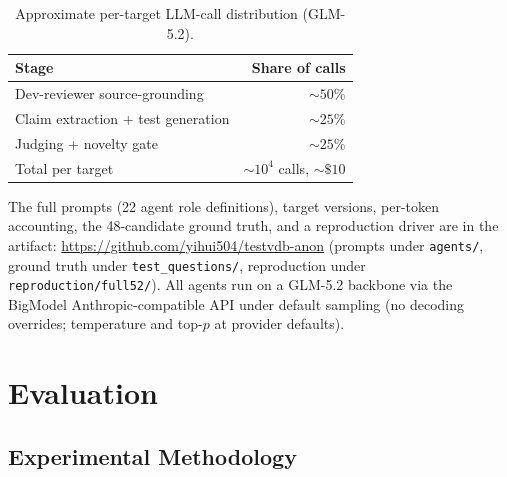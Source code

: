 \documentclass[sigconf]{acmart}
\begin{document}
\begin{table}[t]
\caption{Approximate per-target LLM-call distribution (GLM-5.2).}
\label{tab:cost}
\small
\begin{tabular}{@{}lr@{}}
\toprule
Stage & Share of calls \\
\midrule
Dev-reviewer source-grounding & ${\sim}50\%$ \\
Claim extraction + test generation & ${\sim}25\%$ \\
Judging + novelty gate & ${\sim}25\%$ \\
\midrule
Total per target & ${\sim}10^4$ calls, ${\sim}\$10$ \\
\bottomrule
\end{tabular}
\end{table} The full prompts (22 agent role definitions), target versions, per-token accounting, the 48-candidate ground truth, and a reproduction driver are in the artifact: \url{https://github.com/yihui504/testvdb-anon} (prompts under \texttt{agents/}, ground truth under \texttt{test\_questions/}, reproduction under \texttt{reproduction/full52/}). All agents run on a GLM-5.2 backbone via the BigModel Anthropic-compatible API under default sampling (no decoding overrides; temperature and top-$p$ at provider defaults).
\section{Evaluation}
\label{sec:eval}

\subsection{Experimental Methodology}
\label{subsec:methodology}
\end{document}
